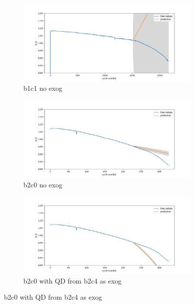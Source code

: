 \documentclass{article}
\begin{document}
\begin{figure}[H]
\centering
    \begin{subfigure}{.5\textwidth}
  \centering
  \includegraphics[width=1\linewidth]{figs/auto_arima_no_exog_03split_b1c1.png}
  \caption{b1c1 no exog}
  \label{fig2:sub1}
\end{subfigure}%
\begin{subfigure}{.5\textwidth}
  \centering
  \includegraphics[width=1\linewidth]{figs/auto_arima_no_exog_03split_b2c0.png}
  \caption{b2c0 no exog}
  \label{fig2:sub2}
\end{subfigure}
\begin{subfigure}{.5\textwidth}
  \centering
  \includegraphics[width=1\linewidth]{figs/auto_arima_exog(c4-QD)_03split_b2c0.png}
  \caption{b2c0 with QD from b2c4 as exog}

\end{subfigure}
\end{figure}
\end{document}
